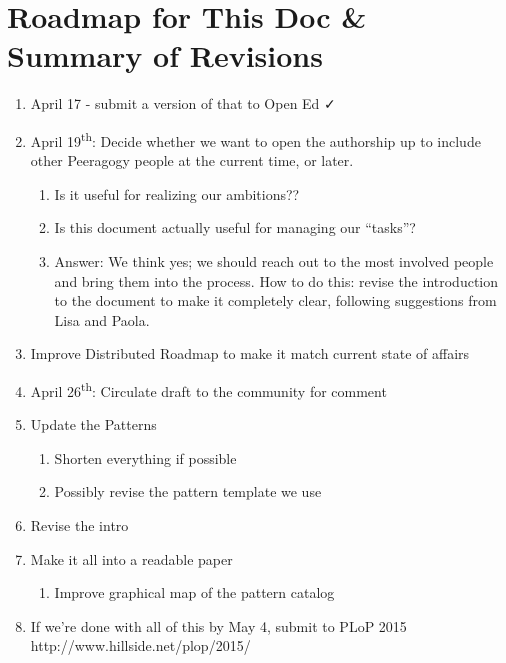 \section{Roadmap for This Doc \& Summary of Revisions}

\begin{enumerate}
\item April 17 - submit a version of that to Open Ed ✓
\item April 19\textsuperscript{th}: Decide whether we want to open the authorship up to include other Peeragogy people at the current time, or later. 
\begin{enumerate}
\item Is it useful for realizing our ambitions??
\item Is this document actually useful for managing our ``tasks''?
\item Answer: We think yes; we should reach out to the most involved people and bring them into the process.  How to do this: revise the introduction to the document to make it completely clear, following suggestions from Lisa and Paola.
\end{enumerate}
\item Improve Distributed Roadmap to make it match current state of affairs 
\item April 26\textsuperscript{th}: Circulate draft to the community for comment
\item Update the Patterns
\begin{enumerate}
\item Shorten everything if possible
\item Possibly revise the pattern template we use
\end{enumerate}
\item Revise the intro
\item Make it all into a readable paper
\begin{enumerate}
\item Improve graphical map of the pattern catalog
\end{enumerate}
\item If we're done with all of this by May 4, submit to PLoP 2015 http://www.hillside.net/plop/2015/
\end{enumerate}